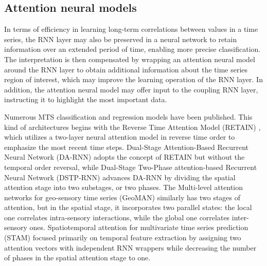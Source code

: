 \documentclass{svproc}
\begin{document}
\subsection{Attention neural models}
\label{sec:rel1}
In terms of efficiency in learning long-term correlations between values in a time series, the RNN layer may also be preserved in a neural network to retain information over an extended period of time, enabling more precise classification. The interpretation is then compensated by wrapping an attention neural model around the RNN layer to obtain additional information about the time series region of interest, which may improve the learning operation of the RNN layer. In addition, the attention neural model may offer input to the coupling RNN layer, instructing it to highlight the most important data.

Numerous MTS classification and regression models have been published. This kind of architectures begins with the Reverse Time Attention Model (RETAIN) \cite{choi2016retain}, which utilizes a two-layer neural attention model in reverse time order to emphasize the most recent time steps. Dual-Stage Attention-Based Recurrent Neural Network (DA-RNN) \cite{qin2017dual} adopts the concept of RETAIN but without the temporal order reversal, while Dual-Stage Two-Phase attention-based Recurrent Neural Network (DSTP-RNN) \cite{liu2020dstp} advances DA-RNN by dividing the spatial attention stage into two substages, or two phases. The Multi-level attention networks for geo-sensory time series (GeoMAN) \cite{liang2018geoman}similarly has two stages of attention, but in the spatial stage, it incorporates two parallel states: the local one correlates intra-sensory interactions, while the global one correlates inter-sensory ones. Spatiotemporal attention for multivariate time series prediction (STAM) \cite{gangopadhyay2021spatiotemporal} focused primarily on temporal feature extraction by assigning two attention vectors with independent RNN wrappers while decreasing the number of phases in the spatial attention stage to one. 
\end{document}
